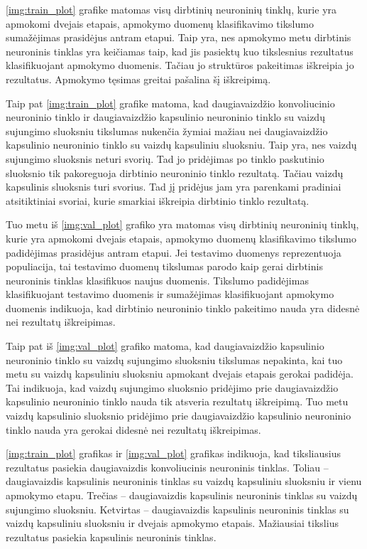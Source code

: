 \ref{img:train_plot} grafike matomas visų dirbtinių neuroninių tinklų, kurie yra apmokomi dvejais etapais, apmokymo duomenų klasifikavimo tikslumo sumažėjimas prasidėjus antram etapui. Taip yra, nes apmokymo metu dirbtinis neuroninis tinklas yra keičiamas taip, kad jis pasiektų kuo tikslesnius rezultatus klasifikuojant apmokymo duomenis. Tačiau jo struktūros pakeitimas iškreipia jo rezultatus. Apmokymo tęsimas greitai pašalina šį iškreipimą.

Taip pat \ref{img:train_plot} grafike matoma, kad daugiavaizdžio konvoliucinio neuroninio tinklo ir daugiavaizdžio kapsulinio neuroninio tinklo su vaizdų sujungimo sluoksniu tikslumas nukenčia žymiai mažiau nei daugiavaizdžio kapsulinio neuroninio tinklo su vaizdų kapsuliniu sluoksniu. Taip yra, nes vaizdų sujungimo sluoksnis neturi svorių. Tad jo pridėjimas po tinklo paskutinio sluoksnio tik pakoreguoja dirbtinio neuroninio tinklo rezultatą. Tačiau vaizdų kapsulinis sluoksnis turi svorius. Tad jį pridėjus jam yra parenkami pradiniai atsitiktiniai svoriai, kurie smarkiai iškreipia dirbtinio tinklo rezultatą.

Tuo metu iš \ref{img:val_plot} grafiko yra matomas visų dirbtinių neuroninių tinklų, kurie yra apmokomi dvejais etapais, apmokymo duomenų klasifikavimo tikslumo padidėjimas prasidėjus antram etapui. Jei testavimo duomenys reprezentuoja populiacija, tai testavimo duomenų tikslumas parodo kaip gerai dirbtinis neuroninis tinklas klasifikuos naujus duomenis. Tikslumo padidėjimas klasifikuojant testavimo duomenis ir sumažėjimas  klasifikuojant apmokymo duomenis indikuoja, kad dirbtinio neuroninio tinklo pakeitimo nauda yra didesnė nei rezultatų iškreipimas.

Taip pat iš \ref{img:val_plot} grafiko matoma, kad daugiavaizdžio kapsulinio neuroninio tinklo su vaizdų sujungimo sluoksniu tikslumas nepakinta, kai tuo metu su vaizdų kapsuliniu sluoksniu apmokant dvejais etapais gerokai padidėja. Tai indikuoja, kad vaizdų sujungimo sluoksnio pridėjimo prie daugiavaizdžio kapsulinio neuroninio tinklo nauda tik atsveria rezultatų iškreipimą. Tuo metu vaizdų kapsulinio sluoksnio pridėjimo prie daugiavaizdžio kapsulinio neuroninio tinklo nauda yra gerokai didesnė nei rezultatų iškreipimas.

\ref{img:train_plot} grafikas ir \ref{img:val_plot} grafikas indikuoja, kad tiksliausius rezultatus pasiekia daugiavaizdis konvoliucinis neuroninis tinklas. Toliau -- daugiavaizdis kapsulinis neuroninis tinklas su vaizdų kapsuliniu sluoksniu ir vienu apmokymo etapu. Trečias -- daugiavaizdis kapsulinis neuroninis tinklas su vaizdų sujungimo sluoksniu. Ketvirtas -- daugiavaizdis kapsulinis neuroninis tinklas su vaizdų kapsuliniu sluoksniu ir dvejais apmokymo etapais. Mažiausiai tikslius rezultatus pasiekia kapsulinis neuroninis tinklas.

